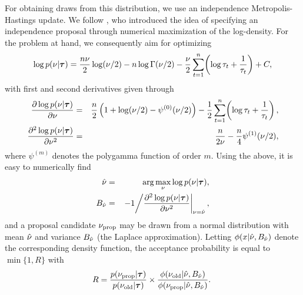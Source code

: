 \documentclass[article, nojss]{jss}
\begin{document}
For obtaining draws from this distribution, we use an independence Metropolis-Hastings update. We follow \cite{chi-gre:bay}, who introduced the idea of specifying an independence proposal through numerical maximization of the log-density. For the problem at hand, we consequently aim for optimizing
\begin{eqnarray}
 \label{logdfdens}
\log p(\nu|\bm{\tau}) = \frac{n\nu}{2}\log(\nu/2) -
n\log\Gamma(\nu/2)-
\frac{\nu}{2}\sum_{t=1}^n\!\left(\log\tau_t+\frac{1}{\tau_t}\right) + C,
\end{eqnarray}
with first and second derivatives given through
\begin{eqnarray}
 \label{d1}
 \frac{\partial \log p(\nu|\bm{\tau})}{\partial \nu} &=&
 \frac{n}{2}\left(1 + \log(\nu/2) -\psi^{(0)}(\nu/2)\right) -
 \frac{1}{2}\sum_{t=1}^n\!\left(\log\tau_t + \frac{1}{\tau_t}\right),\\
\label{d2}
\frac{\partial^2 \log p(\nu|\bm{\tau})}{\partial \nu^2} &=&
\frac{n}{2\nu} - \frac{n}{4}\psi^{(1)}(\nu/2),
\end{eqnarray}
where $\psi^{(m)}$ denotes the polygamma function of order $m$. Using the above, it is easy to numerically find
\begin{eqnarray*}
\hat {\nu} &=& \arg\max_{\nu} \log p(\nu|\bm{\tau}),\\
B_{\hat {\nu}} &=& \left.-1\middle/\frac{\partial^2 \log p(\nu|\bm{\tau})}{\partial \nu^2}\right|_{\nu=\hat{\nu}},
\end{eqnarray*}
and a proposal candidate $\nu_\text{prop}$ may be drawn from a normal distribution with mean $\hat{\nu}$ and variance $B_{\hat {\nu}}$ (the Laplace approximation). Letting $\phi(x| \hat{\nu}, B_{\hat {\nu}})$ denote the corresponding density function, the acceptance probability is equal to $\min\{1,R\}$ with
\[
R = \frac{p(\nu_\text{prop}|\bm{\tau})}{p(\nu_\text{old}|\bm{\tau})} \times
\frac{\phi(\nu_\text{old}| \hat {\nu}, B_{\hat {\nu}})}{\phi(\nu_\text{prop}| \hat {\nu}, B_{\hat {\nu}})}.
\
\]
\end{document}
